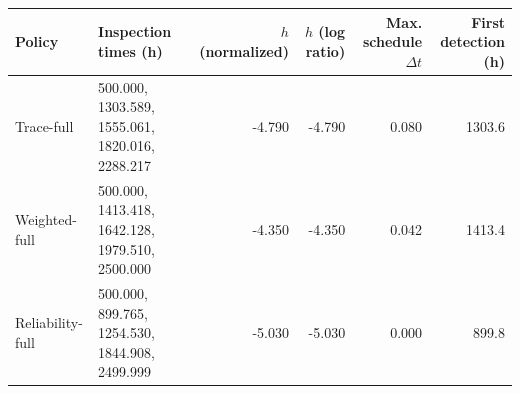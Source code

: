 \begin{tabular}{llrrrr}
\toprule
Policy & Inspection times (h) & $h$ (normalized) & $h$ (log ratio) & Max. schedule $\Delta t$ & First detection (h) \\
\midrule
Trace-full & 500.000, 1303.589, 1555.061, 1820.016, 2288.217 & -4.790 & -4.790 & 0.080 & 1303.6 \\
Weighted-full & 500.000, 1413.418, 1642.128, 1979.510, 2500.000 & -4.350 & -4.350 & 0.042 & 1413.4 \\
Reliability-full & 500.000, 899.765, 1254.530, 1844.908, 2499.999 & -5.030 & -5.030 & 0.000 & 899.8 \\
\bottomrule
\end{tabular}
